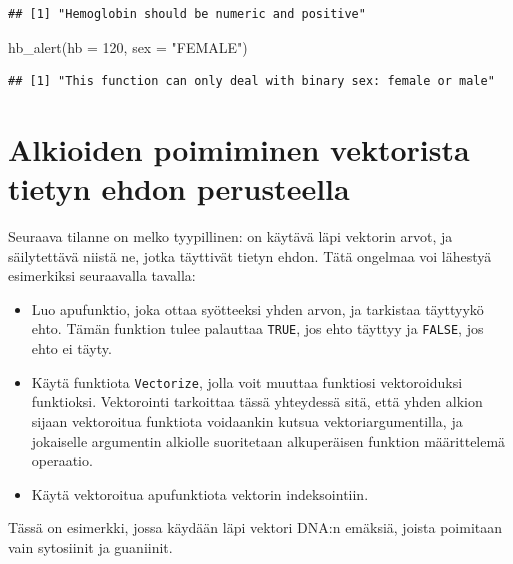 \documentclass[
]{book}
\newenvironment{Shaded}{\begin{snugshade}}{\end{snugshade}}
\newcommand{\AttributeTok}[1]{\textcolor[rgb]{0.77,0.63,0.00}{#1}}
\newcommand{\DecValTok}[1]{\textcolor[rgb]{0.00,0.00,0.81}{#1}}
\newcommand{\FunctionTok}[1]{\textcolor[rgb]{0.00,0.00,0.00}{#1}}
\newcommand{\NormalTok}[1]{#1}
\newcommand{\StringTok}[1]{\textcolor[rgb]{0.31,0.60,0.02}{#1}}
\providecommand{\tightlist}{%
  \setlength{\itemsep}{0pt}\setlength{\parskip}{0pt}}
\begin{document}
\begin{verbatim}
## [1] "Hemoglobin should be numeric and positive"
\end{verbatim}

\begin{Shaded}
\begin{Highlighting}[]
\FunctionTok{hb\_alert}\NormalTok{(}\AttributeTok{hb =} \DecValTok{120}\NormalTok{, }\AttributeTok{sex =} \StringTok{"FEMALE"}\NormalTok{)}
\end{Highlighting}
\end{Shaded}

\begin{verbatim}
## [1] "This function can only deal with binary sex: female or male"
\end{verbatim}

\hypertarget{alkioiden-poimiminen-vektorista-tietyn-ehdon-perusteella}{%
\section{Alkioiden poimiminen vektorista tietyn ehdon perusteella}\label{alkioiden-poimiminen-vektorista-tietyn-ehdon-perusteella}}

Seuraava tilanne on melko tyypillinen: on käytävä läpi vektorin arvot, ja säilytettävä niistä ne, jotka täyttivät tietyn ehdon. Tätä ongelmaa voi lähestyä esimerkiksi seuraavalla tavalla:

\begin{itemize}
\tightlist
\item
  Luo apufunktio, joka ottaa syötteeksi yhden arvon, ja tarkistaa täyttyykö ehto. Tämän funktion tulee palauttaa \texttt{TRUE}, jos ehto täyttyy ja \texttt{FALSE}, jos ehto ei täyty.
\item
  Käytä funktiota \texttt{Vectorize}, jolla voit muuttaa funktiosi vektoroiduksi funktioksi. Vektorointi tarkoittaa tässä yhteydessä sitä, että yhden alkion sijaan vektoroitua funktiota voidaankin kutsua vektoriargumentilla, ja jokaiselle argumentin alkiolle suoritetaan alkuperäisen funktion määrittelemä operaatio.
\item
  Käytä vektoroitua apufunktiota vektorin indeksointiin.
\end{itemize}

Tässä on esimerkki, jossa käydään läpi vektori DNA:n emäksiä, joista poimitaan vain sytosiinit ja guaniinit.
\end{document}
